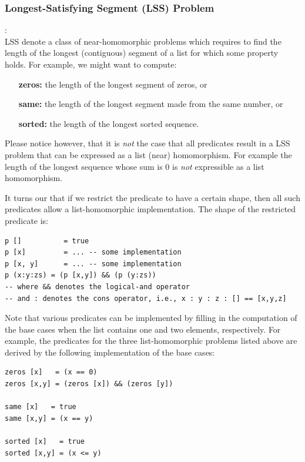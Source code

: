 \documentclass[acmsmall,review]{acmart}\settopmatter{printfolios=true,printccs=false,printacmref=false}
\begin{document}
\subsubsection{Longest-Satisfying Segment (LSS) Problem}:
$\mbox{ }$\\

LSS denote a class of near-homomorphic problems which requires 
to find the length of the longest (contiguous) segment of a list 
for which some property holds.
For example, we might want to compute:
\begin{itemize}
    \item[{\bf zeros:}] the length of the longest segment of 
            zeros, or 
    \item[{\bf same:}]  the length of the longest segment made 
            from the same number, or 
    \item[{\bf sorted:}] the length of the longest sorted 
            sequence.
\end{itemize}

Please notice however, that it is \emph{not} the case that all 
predicates result in a LSS problem that can be expressed as a
list (near) homomorphism. For example the length of the longest 
sequence whose sum is $0$ is \emph{not} expressible as a list 
homomorphism.

It turns our that if we restrict the predicate to have a certain
shape, then all such predicates allow a list-homomorphic implementation.
The shape of the restricted predicate is:

\begin{lstlisting}[mathescape=true]
p []          = true
p [x]         = ... -- some implementation
p [x, y]      = ... -- some implementation
p (x:y:zs) = (p [x,y]) && (p (y:zs))
-- where && denotes the logical-and operator
-- and : denotes the cons operator, i.e., x : y : z : [] == [x,y,z] 
\end{lstlisting}\vspace{-2ex}

Note that various predicates can be implemented by filling in the 
computation of the base cases when the list contains one and two
elements, respectively.   For example, the predicates for the
three list-homomorphic problems listed above are derived by the
following implementation of the base cases:

\begin{lstlisting}[mathescape=true]
zeros [x]   = (x == 0)           
zeros [x,y] = (zeros [x]) && (zeros [y])

same [x]   = true         
same [x,y] = (x == y)

sorted [x]   = true
sorted [x,y] = (x <= y)
\end{lstlisting}\vspace{-2ex}
\end{document}
